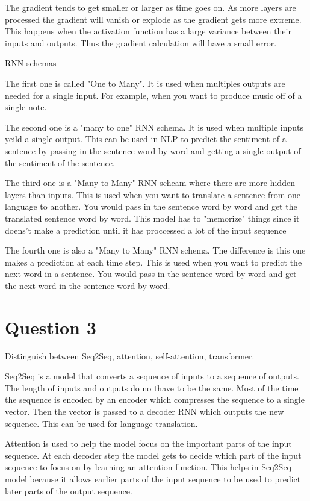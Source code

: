 \documentclass{article}
\begin{document}
The gradient tends to get smaller or larger as time goes on. As more layers are processed the gradient will vanish or explode as the gradient gets more extreme. This happens when the activation function has a large variance between their inputs and outputs. Thus the gradient calculation will have a small error.



RNN schemas

The first one is called "One to Many". It is used when multiples outputs are needed for a single input. For example, when you want to produce music off of a single note.

The second one is a "many to one" RNN schema. It is used when multiple inputs yeild a single output. This can be used in NLP to predict the sentiment of a sentence by passing in the sentence word by word and getting a single output of the sentiment of the sentence.

The third one is a "Many to Many" RNN scheam where there are more hidden layers than inputs. This is used when you want to translate a sentence from one language to another. You would pass in the sentence word by word and get the translated sentence word by word. This model has to "memorize" things since it doens't make a prediction until it has proccessed a lot of the input sequence

The fourth one is also a "Many to Many" RNN schema. The difference is this one makes a prediction at each time step. This is used when you want to predict the next word in a sentence. You would pass in the sentence word by word and get the next word in the sentence word by word.

\section{Question 3}

Distinguish between Seq2Seq, attention, self-attention, transformer.

Seq2Seq is a model that converts a sequence of inputs to a sequence of outputs. The length of inputs and outputs do no thave to be the same. Most of the time the sequence is encoded by an encoder which compresses the sequence to a single vector. Then the vector is passed to a decoder RNN which outputs the new sequence. This can be used for language translation.

Attention is used to help the model focus on the important parts of the input sequence. At each decoder step the model gets to decide which part of the input sequence to focus on by learning an attention function. This helps in Seq2Seq model because it allows earlier parts of the input sequence to be used to predict later parts of the output sequence.
\end{document}
